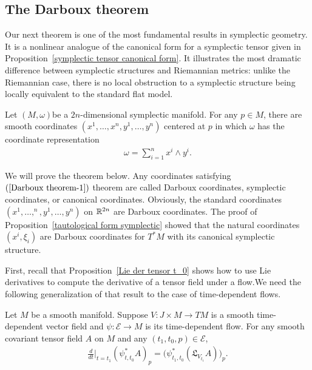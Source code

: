 \subsection{The Darboux theorem}
Our next theorem is one of the most fundamental results in symplectic geometry. It is a nonlinear analogue of the canonical form for a symplectic tensor given in Proposition~\ref{symplectic tensor canonical form}. It illustrates the most dramatic difference between symplectic structures and Riemannian metrics: unlike the Riemannian case, there is no local obstruction to a symplectic structure being locally equivalent to the standard flat model.
\begin{theorem}
Let $(M,\omega)$be a $2n$-dimensional symplectic manifold. For any $p\in M$, there are smooth coordinates $(x^1,\dots,x^n,y^1,\dots,y^n)$ centered at $p$ in which $\omega$ has the coordinate representation
\begin{align}\label{Darboux theorem-1}
\omega=\sum_{i=1}^{n}x^i\wedge y^i.
\end{align}
\end{theorem}
We will prove the theorem below. Any coordinates satisfying $(\ref{Darboux theorem-1})$ theorem are called Darboux coordinates, symplectic coordinates, or canonical coordinates. Obviously, the standard coordinates $(x^1,\dots,^n,y^1,\dots,y^n)$ on $\mathbb{R}^{2n}$ are Darboux coordinates. The proof of Proposition~\ref{tautological form symplectic} showed that the natural coordinates $(x^i,\xi_i)$ are Darboux coordinates for $T^*M$ with its canonical symplectic structure.\par
First, recall that Proposition~\ref{Lie der tensor t_0} shows how to use Lie derivatives to compute the derivative of a tensor field under a flow.We need the following generalization of that result to the case of time-dependent flows.
\begin{proposition}\label{Lie der tensor t_0 time-dependent vector}
Let $M$ be a smooth manifold. Suppose $V:J\times M\to TM$ is a smooth time-dependent vector field and $\psi:\mathcal{E}\to M$ is its time-dependent flow. For any smooth covariant tensor field $A$ on $M$ and any $(t_1,t_0,p)\in\mathcal{E}$,
\begin{align}\label{Lie der tensor t_0 time-dependent vector-1}
\frac{d}{dt}\Big|_{t=t_1}(\psi_{t,t_0}^*A)_p=\big(\psi_{t_1,t_0}^*(\mathfrak{L}_{V_{t_1}}A)\big)_p.
\end{align}
\end{proposition}
